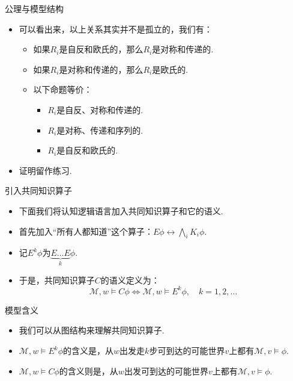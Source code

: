 \begin{frame}{公理与模型结构}
\begin{itemize}
    \item 可以看出来，以上关系其实并不是孤立的，我们有：
\begin{lemma} %
\begin{itemize}
    \item 如果$R_i$是自反和欧氏的，那么$R_i$是对称和传递的.
    \item 如果$R_i$是对称和传递的，那么$R_i$是欧氏的.
    \item 以下命题等价：
    \begin{itemize}
        \item $R_i$是自反、对称和传递的.
\item  $R_i$是对称、传递和序列的.
\item $R_i$是自反和欧氏的.
    \end{itemize}
\end{itemize}
\end{lemma}
\item 证明留作练习.
\end{itemize}
\end{frame}

\begin{frame}{引入共同知识算子}
\begin{itemize}
    \item 下面我们将认知逻辑语言加入共同知识算子和它的语义.
    \item 首先加入“所有人都知道”这个算子：$E\phi\leftrightarrow\bigwedge_i K_i\phi$.
    \item 记$E^k\phi$为$\underbrace{E\dots E}_k\phi$.
    \item 于是，共同知识算子$C$的语义定义为：
    \[\mathcal M,w\vDash C\phi\iff\mathcal M,w\vDash E^k\phi,\quad k=1,2,\dots\]
\end{itemize}
\end{frame}

\begin{frame}{模型含义}
\begin{itemize}
    \item 我们可以从图结构来理解共同知识算子.
    \item $\mathcal M,w\vDash E^k\phi$的含义是，从$w$出发走$k$步可到达的可能世界$v$上都有$\mathcal M,v\vDash \phi$.
    \item $\mathcal M,w\vDash C\phi$的含义则是，从$w$出发可到达的可能世界$v$上都有$\mathcal M,v\vDash \phi$.
\end{itemize}
\end{frame}


